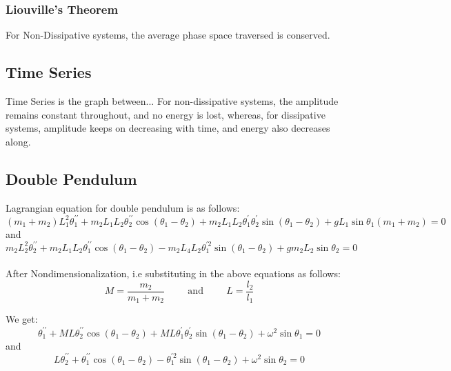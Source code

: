 \documentclass[11pt]{scrartcl} %
\begin{document}
\subsubsection{Liouville's Theorem}
For Non-Dissipative systems, the average phase space traversed is conserved.

\subsection{Time Series}
Time Series is the graph between... For non-dissipative systems, the amplitude remains constant throughout, and no energy is lost, whereas, for dissipative systems, amplitude keeps on decreasing with time, and energy also decreases along.

\subsection{Double Pendulum}
Lagrangian equation for double pendulum is as follows:
\begin{equation}
\left(m_{1}+m_{2}\right) L_{1}^{2} \theta_{1}^{\prime \prime}+m_{2} L_{1} L_{2} \theta_{2}^{\prime \prime} \cos \left(\theta_{1}-\theta_{2}\right)+m_{2} L_{1} L_{2} \theta_{1}^{\prime} \theta_{2}^{\prime} \sin \left(\theta_{1}-\theta_{2}\right)+g L_{1} \sin \theta_{1}\left(m_{1}+m_{2}\right)=0
\end{equation}
and
\begin{equation}
m_{2} L_{2}^{2} \theta_{2}^{\prime \prime}+m_{2} L_{1} L_{2} \theta_{1}^{\prime \prime} \cos \left(\theta_{1}-\theta_{2}\right)-m_{2} L_{4} L_{2} \theta_{1}^{\prime 2} \sin \left(\theta_{1}-\theta_{2}\right)+g m_{2} L_{2} \sin \theta_{2}=0
\end{equation}
\\
After Nondimensionalization, i.e substituting in the above equations as follows:
\begin{equation*}
M=\frac{m_{2}}{m_{1}+m_{2}} \hspace{1cm} \mbox{and} \hspace{1cm} L=\frac{l_{2}}{l_{1}}
\end{equation*}

We get:
\begin{equation}
\theta_{1}^{\prime \prime}+M L \theta_{2}^{\prime \prime} \cos \left(\theta_{1}-\theta_{2}\right)+M L \theta_{1}^{\prime} \theta_{2}^{\prime} \sin \left(\theta_{1}-\theta_{2}\right)+\omega^{2} \sin \theta_{1}=0
\end{equation}
and
\begin{equation}
L \theta_{2}^{\prime \prime}+\theta_{1}^{\prime \prime} \cos \left(\theta_{1}-\theta_{2}\right)-\theta_{1}^{\prime 2} \sin \left(\theta_{1}-\theta_{2}\right)+\omega^{2} \sin \theta_{2}=0
\end{equation}
\end{document}
